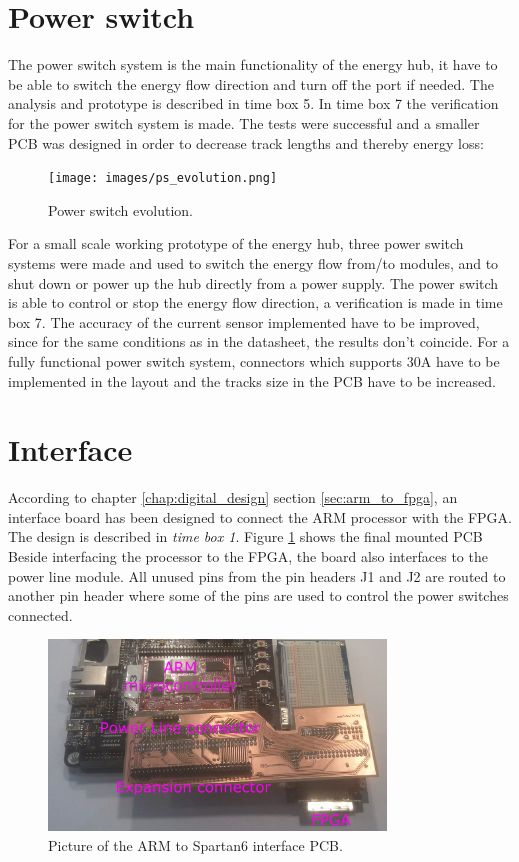 \section{Power switch}
The power switch system is the main functionality of the energy hub, it have to be able to switch the energy flow direction and turn off the port if needed. The analysis and prototype is described in time box 5. In time box 7 the verification for the power switch system is made.
\p
The tests were successful and a smaller PCB was designed in order to decrease track lengths and thereby energy loss:
\begin{figure}[H]
	\begin{centering}
		\texttt{[image: images/ps\_evolution.png]}
		\caption{Power switch evolution.}
	\end{centering}
\end{figure}

For a small scale working prototype of the energy hub, three power switch systems were made and used to switch the energy flow from/to modules, and to shut down or power up the hub directly from a power supply.
\p
The power switch is able to control or stop the energy flow direction, a verification is made in time box 7. The accuracy of the current sensor implemented have to be improved, since for the same conditions as in the datasheet, the results don't coincide. For a fully functional power switch system, connectors which supports 30A have to be implemented in the layout and the tracks size in the PCB have to be increased.
%

\section{Interface}
According to chapter \ref{chap:digital_design} section \ref{sec:arm_to_fpga}, an interface board has been designed to connect the ARM processor with the FPGA. 
The design is described in \textit{time box 1}. Figure \ref{fig:arm2fpga_interface} shows the final mounted PCB
\p Beside interfacing the processor to the FPGA, the board also interfaces to the power line module. 
\p All unused pins from the pin headers J1 and J2 are routed to another pin header where some of the pins are used to control the power switches connected.
 
\begin{figure}[H]
	\begin{centering}
		 \includegraphics[width=0.80\textwidth]{images/hw_interface_photo_v0_2.jpg}
		\caption{Picture of the ARM to Spartan6 interface PCB.}
		\label{fig:arm2fpga_interface}
	\end{centering}
\end{figure}
